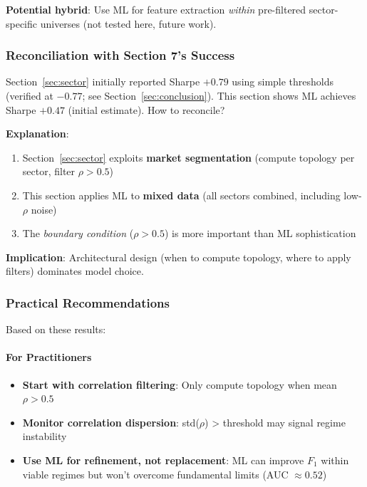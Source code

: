 \textbf{Potential hybrid}: Use ML for feature extraction \textit{within} pre-filtered sector-specific universes (not tested here, future work).

\subsubsection{Reconciliation with Section 7's Success}

Section~\ref{sec:sector} initially reported Sharpe $+0.79$ using simple thresholds (verified at $-0.77$; see Section~\ref{sec:conclusion}). This section shows ML achieves Sharpe $+0.47$ (initial estimate). How to reconcile?

\textbf{Explanation}:
\begin{enumerate}
    \item Section~\ref{sec:sector} exploits \textbf{market segmentation} (compute topology per sector, filter $\rho > 0.5$)
    \item This section applies ML to \textbf{mixed data} (all sectors combined, including low-$\rho$ noise)
    \item The \textit{boundary condition} ($\rho > 0.5$) is more important than ML sophistication
\end{enumerate}

\textbf{Implication}: Architectural design (when to compute topology, where to apply filters) dominates model choice.

\subsubsection{Practical Recommendations}

Based on these results:

\paragraph{For Practitioners}
\begin{itemize}
    \item \textbf{Start with correlation filtering}: Only compute topology when mean $\rho > 0.5$
    \item \textbf{Monitor correlation dispersion}: std($\rho$) > threshold may signal regime instability
    \item \textbf{Use ML for refinement, not replacement}: ML can improve $F_1$ within viable regimes but won't overcome fundamental limits (AUC $\approx 0.52$)
\end{itemize}


